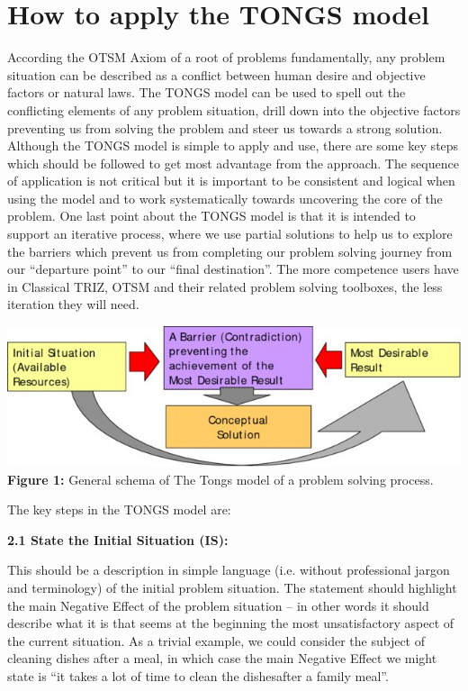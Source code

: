 \documentclass[11pt,a4paper]{article}
\begin{document}
\section{How to apply the TONGS model}

According the OTSM Axiom of a root of problems fundamentally, any problem
situation can be described as a conflict between human desire and objective
factors or natural laws. The TONGS model can be used to spell out the
conflicting elements of any problem situation, drill down into the objective
factors preventing us from solving the problem and steer us towards a strong
solution.  Although the TONGS model is simple to apply and use, there are some
key steps which should be followed to get most advantage from the approach.
The sequence of application is not critical but it is important to be
consistent and logical when using the model and to work systematically towards
uncovering the core of the problem.  One last point about the TONGS model is
that it is intended to support an iterative process, where we use partial
solutions to help us to explore the barriers which prevent us from completing
our problem solving journey from our “departure point” to our “final
destination”.  The more competence users have in Classical TRIZ, OTSM and
their related problem solving toolboxes, the less iteration they will need.

\begin{center}
\includegraphics[width=.95\textwidth]{./1.jpg}\\
\textbf{Figure 1:} General schema of The Tongs model of a problem solving
    process.
\end{center}

The key steps in the TONGS model are:

\textbf{2.1 State the Initial Situation (IS):}

This should be a description in simple language (i.e. without professional
jargon and terminology) of the initial problem situation.  The statement
should highlight the main Negative Effect of the problem situation -- in other
words it should describe what it is that seems at the beginning the most
unsatisfactory aspect of the current situation.  As a trivial example, we
could consider the subject of cleaning dishes after a meal, in which case the
main Negative Effect we might state is “it takes a lot of time to clean the
dishesafter a family meal”.
\end{document}
